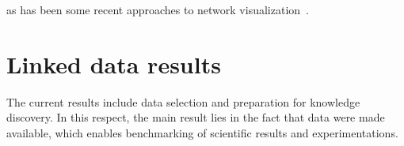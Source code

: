 																																																																																																																																																																																																																																																																																																																																																																																																															as has been some recent approaches to network visualization~\cite{Viz1}.


																																																																																																																																																																																																																																																																																																																																																																																																															\section{Linked data results}
																																																																																																																																																																																																																																																																																																																																																																																																															\label{outline}
																																																																																																																																																																																																																																																																																																																																																																																																															The current results include data selection and preparation for knowledge discovery.
																																																																																																																																																																																																																																																																																																																																																																																																															In this respect, the main result lies in the fact that data were made available, which enables benchmarking of scientific results
																																																																																																																																																																																																																																																																																																																																																																																																															and experimentations.
